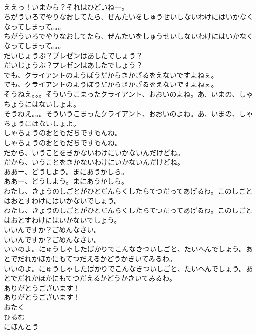 \documentclass[8pt]{extreport}
\begin{document}
\begin{CJK}{UTF8}{min}
\\	ええっ！いまから？それはひどいねー。 
\\	ちがういろでやりなおしてたら、ぜんたいをしゅうせいしないわけにはいかなくなってしまって。。。	
\\	ちがういろでやりなおしてたら、ぜんたいをしゅうせいしないわけにはいかなくなってしまって。。。 
\\	だいじょうぶ？プレゼンはあしたでしょう？	
\\	だいじょうぶ？プレゼンはあしたでしょう？ 
\\	でも、クライアントのようぼうだからきかざるをえないですよねぇ。	
\\	でも、クライアントのようぼうだからきかざるをえないですよねぇ。 
\\	そうねえ。。。そういうこまったクライアント、おおいのよね。あ、いまの、しゃちょうにはないしょよ。	
\\	そうねえ。。。そういうこまったクライアント、おおいのよね。あ、いまの、しゃちょうにはないしょよ。 
\\	しゃちょうのおともだちですもんね。	
\\	しゃちょうのおともだちですもんね。 
\\	だから、いうことをきかないわけにいかないんだけどね。	
\\	だから、いうことをきかないわけにいかないんだけどね。 
\\	ああー、どうしよう。まにあうかしら。	
\\	ああー、どうしよう。まにあうかしら。 
\\	わたし、きょうのしごとがひとだんらくしたらてつだってあげるわ。このしごとはおとすわけにはいかないでしょう。	
\\	わたし、きょうのしごとがひとだんらくしたらてつだってあげるわ。このしごとはおとすわけにはいかないでしょう。 
\\	いいんですか？ごめんなさい。	
\\	いいんですか？ごめんなさい。 
\\	いいのよ。にゅうしゃしたばかりでこんなきついしごと、たいへんでしょう。あとでだれかほかにもてつだえるかどうかきいてみるわ。	
\\	いいのよ。にゅうしゃしたばかりでこんなきついしごと、たいへんでしょう。あとでだれかほかにもてつだえるかどうかきいてみるわ。 
\\	ありがとうございます！	
\\	ありがとうございます！ 
\\	おたく
\\	ひるむ
\\	にほんとう

\end{CJK}
\end{document}
